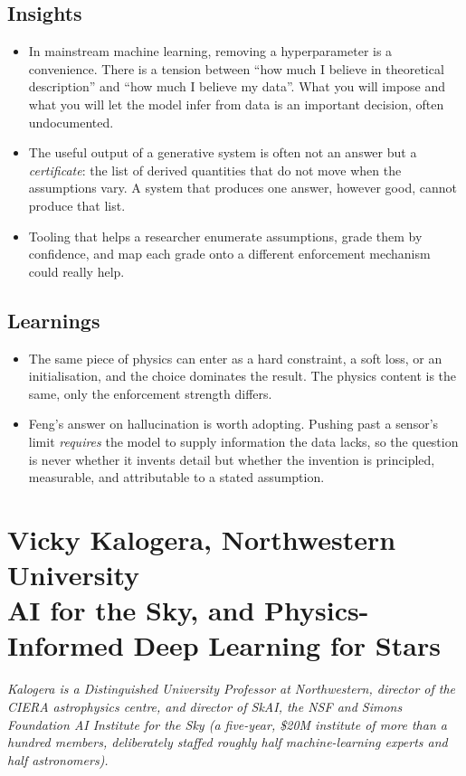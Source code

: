 \documentclass[11pt]{article}
\begin{document}
\subsection*{Insights}
\begin{itemize}
    \item In mainstream machine learning, removing a hyperparameter is a convenience. There is a tension between ``how much I believe in theoretical description'' and ``how much I believe my data''. What you will impose and what you will let the model infer from data is an important decision, often undocumented.
    \item The useful output of a generative system is often not an answer but a \emph{certificate}: the list of derived quantities that do not move when the assumptions vary. A system that produces one answer, however good, cannot produce that list.
    \item  Tooling that helps a researcher enumerate assumptions, grade them by confidence, and map each grade onto a different enforcement mechanism could really help.
\end{itemize}

\subsection*{Learnings}
\begin{itemize}
    \item The same piece of physics can enter as a hard constraint, a soft loss, or an initialisation, and the choice dominates the result. The physics content is the same, only the enforcement strength differs.
    \item Feng's answer on hallucination is worth adopting. Pushing past a sensor's limit \emph{requires} the model to supply information the data lacks, so the question is never whether it invents detail but whether the invention is principled, measurable, and attributable to a stated assumption.
\end{itemize}

\section{Vicky Kalogera, Northwestern University\\ {\large AI for the Sky, and Physics-Informed Deep Learning for Stars}}

\emph{Kalogera is a Distinguished University Professor at Northwestern, director of the CIERA astrophysics centre, and director of SkAI, the NSF and Simons Foundation AI Institute for the Sky (a five-year, \$20M institute of more than a hundred members, deliberately staffed roughly half machine-learning experts and half astronomers).}
\end{document}
